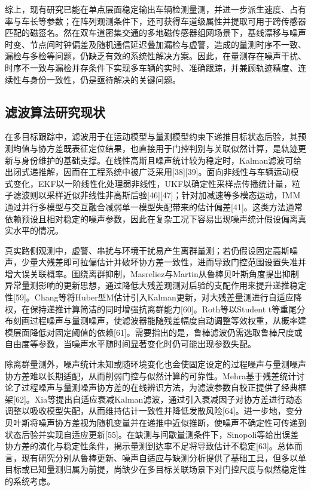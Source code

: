 \documentclass{xdupgthesis}
\begin{document}
综上，现有研究已能在单点层面稳定输出车辆检测量测，并进一步派生速度、占有率与车长等参数；在阵列观测条件下，还可获得车道级属性并提取可用于跨传感器匹配的磁签名。然在双车道密集交通的多地磁传感器组网场景下，基线漂移与噪声时变、节点间时钟偏差及随机通信延迟叠加漏检与虚警，造成的量测时序不一致、漏检与多检等问题，仍缺乏有效的系统性解决方案。因此，在量测存在噪声干扰、时序不一致与漏检并存条件下实现多车辆的实时、准确跟踪，并兼顾轨迹精度、连续性与身份一致性，仍是亟待解决的关键问题。

\subsection{滤波算法研究现状}
在多目标跟踪中，滤波用于在运动模型与量测模型约束下递推目标状态后验，其预测均值与协方差既表征定位结果，也直接用于门控判别与关联似然计算，是轨迹更新与身份维护的基础支撑。在线性高斯且噪声统计较为稳定时，Kalman滤波可给出闭式递推解，因而在工程系统中被广泛采用[38][39]。面向非线性与车辆运动模式变化，EKF以一阶线性化处理弱非线性，UKF以确定性采样点传播统计量，粒子滤波则以采样近似非线性非高斯后验[46][47]；针对加减速等多模态运动，IMM通过并行多模型与交互融合减弱单一模型失配带来的估计偏差[41]。这类方法通常依赖预设且相对稳定的噪声参数，因此在复杂工况下容易出现噪声统计假设偏离真实水平的情况。

真实路侧观测中，虚警、串扰与环境干扰易产生离群量测；若仍假设固定高斯噪声，少量大残差即可拉偏估计并破坏协方差一致性，进而导致门控范围设置失准并增大误关联概率。围绕离群抑制，Masreliez与Martin从鲁棒贝叶斯角度提出抑制异常量测影响的更新思想，通过降低大残差观测对后验的支配作用来提升递推稳定性[59]。Chang等将Huber型M估计引入Kalman更新，对大残差量测进行自适应降权，在保持递推计算简洁的同时增强抗离群能力[60]。Roth等以Student t等重尾分布刻画过程噪声与量测噪声，使滤波器能随残差幅度自动调整等效权重，从概率建模层面降低对固定阈值的依赖[61]。需要指出的是，鲁棒滤波仍需选取鲁棒尺度或自由度等参数，当噪声水平随时间显著变化时仍可能出现参数失配。

除离群量测外，噪声统计未知或随环境变化也会使固定设定的过程噪声与量测噪声协方差难以长期适配，从而削弱门控与似然计算的可靠性。Mehra基于残差统计讨论了过程噪声与量测噪声协方差的在线辨识方法，为滤波参数自校正提供了经典框架[62]。Xia等提出自适应衰减Kalman滤波，通过引入衰减因子对协方差进行动态调整以吸收模型失配，从而维持估计一致性并降低发散风险[64]。进一步地，变分贝叶斯将噪声协方差视为随机变量并在递推中近似推断，使噪声不确定性可传递到状态后验并实现自适应更新[55]。在缺测与间歇量测条件下，Sinopoli等给出误差协方差的演化与稳定性条件，揭示量测到达率不足将导致估计不稳定[63]。总体而言，现有研究分别从鲁棒更新、噪声自适应与缺测分析提供了基础工具，但多以单目标或已知量测归属为前提，尚缺少在多目标关联场景下对门控尺度与似然稳定性的系统考虑。
\end{document}
